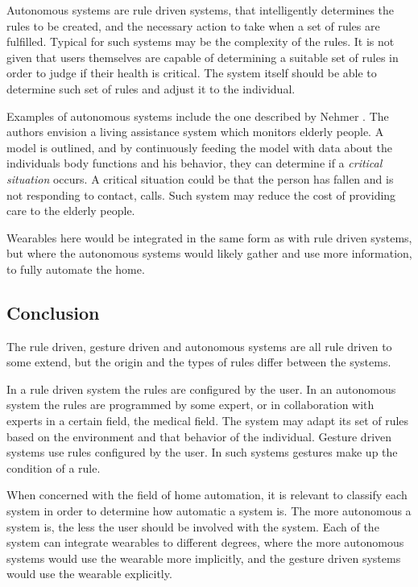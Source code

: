 Autonomous systems are rule driven systems, 
that intelligently determines the rules to be created, 
and the necessary action to take when a set of rules are fulfilled. 
Typical for such systems may be the complexity of the rules. 
It is not given that users themselves are capable of determining a suitable set of rules in order to judge if their health is critical. 
The system itself should be able to determine such set of rules and adjust it to the individual.

Examples of autonomous systems include the one described by Nehmer \etal \cite{nehmer2006living}. 
The authors envision a living assistance system which monitors elderly people. 
A model is outlined, 
and by continuously feeding the model with data about the individuals body functions and his behavior, 
they can determine if a \emph{critical situation} occurs. 
A critical situation could be that the person has fallen and is not responding to contact, \eg calls.
Such system may reduce the cost of providing care to the elderly people.

Wearables here would be integrated in the same form as with rule driven systems, 
but where the autonomous systems would likely gather and use more information, 
to fully automate the home. 

\subsection{Conclusion}

The rule driven, gesture driven and autonomous systems are all rule driven to some extend, 
but the origin and the types of rules differ between the systems. 

In a rule driven system the rules are configured by the user.
In an autonomous system the rules are programmed by some expert, 
or in collaboration with experts in a certain field, \eg the medical field. 
The system may adapt its set of rules based on the environment and that behavior of the individual.
Gesture driven systems use rules configured by the user. 
In such systems gestures make up the condition of a rule.

When concerned with the field of home automation, 
it is relevant to classify each system in order to determine how automatic a system is. 
The more autonomous a system is, 
the less the user should be involved with the system.
Each of the system can integrate wearables to different degrees, 
where the more autonomous systems would use the wearable more implicitly, 
and the gesture driven systems would use the wearable explicitly.  

